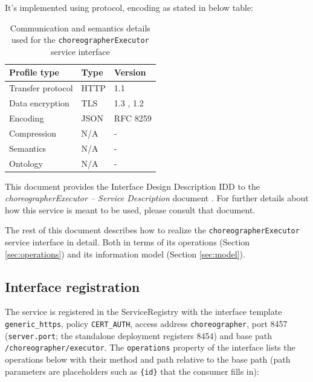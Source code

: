 \documentclass[a4paper]{arrowhead}
\begin{document}
It's implemented using protocol, encoding as stated in below table:
\begin{table}[ht!]
  \centering
  \begin{tabular}{|l|l|l|}
    \hline
    \rowcolor{gray!33} Profile type & Type & Version \\ \hline
    Transfer protocol & HTTP & 1.1 \cite{rfc9112} \\ \hline
    Data encryption & TLS & 1.3 \cite{rfc8446}, 1.2 \cite{rfc5246} \\ \hline
    Encoding & JSON & RFC 8259 \cite{rfc8259} \\ \hline
    Compression & N/A & - \\ \hline
    Semantics & N/A & - \\ \hline
    Ontology & N/A & - \\ \hline
  \end{tabular}
  \caption{Communication and semantics details used for the \texttt{choreographer\allowbreak{}Executor} service interface}
  \label{tab:comunication_semantics_profile}
\end{table}

This document provides the Interface Design Description IDD to the \textit{choreographerExecutor -- Service Description} document \cite{cho-choreographerExecutor-sd}.
For further details about how this service is meant to be used, please consult that document.

The rest of this document describes how to realize the \texttt{choreographer\allowbreak{}Executor} service
interface in detail. Both in terms of its operations (Section \ref{sec:operations}) and its information model (Section \ref{sec:model}).

\subsection{Interface registration}

The service is registered in the ServiceRegistry with the interface template \texttt{generic\_\allowbreak{}https}, policy \texttt{CERT\_\allowbreak{}AUTH}, access address \texttt{choreographer}, port 8457 (\texttt{server.\allowbreak{}port}; the standalone deployment registers 8454) and base path \texttt{/\allowbreak{}choreographer/\allowbreak{}executor}. The \texttt{operations} property of the interface lists the operations below with their method and path relative to the base path (path parameters are placeholders such as \texttt{\{id\}} that the consumer fills in):
\end{document}
